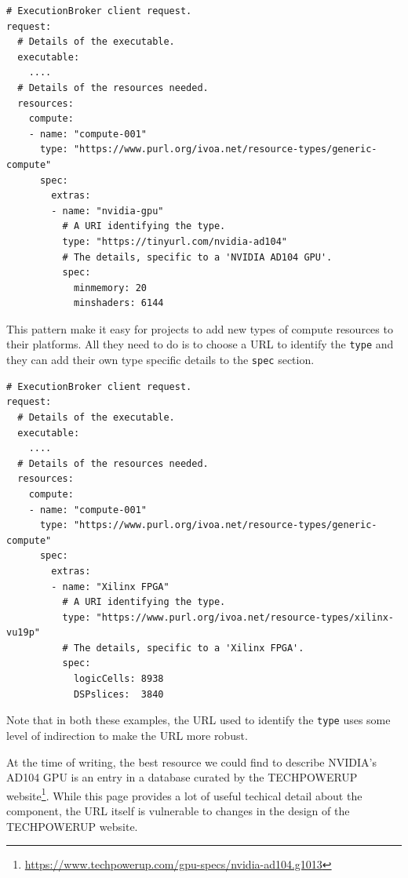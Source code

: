 \documentclass[11pt,a4paper]{ivoa}
\newcommand{\codeword}[1] {\texttt{#1}}
\newcommand{\footurl}[1] {\footnote{\url{#1}}}
\begin{document}
\begin{lstlisting}[]
# ExecutionBroker client request.
request:
  # Details of the executable.
  executable:
    ....
  # Details of the resources needed.
  resources:
    compute:
    - name: "compute-001"
      type: "https://www.purl.org/ivoa.net/resource-types/generic-compute"
      spec:
        extras:
        - name: "nvidia-gpu"
          # A URI identifying the type.
          type: "https://tinyurl.com/nvidia-ad104"
          # The details, specific to a 'NVIDIA AD104 GPU'.
          spec:
            minmemory: 20
            minshaders: 6144
\end{lstlisting}

This pattern make it easy for projects to add new types of compute resources to their
platforms. All they need to do is to choose a URL to identify the \codeword{type}
and they can add their own type specific details to the \codeword{spec} section.

\begin{lstlisting}[]
# ExecutionBroker client request.
request:
  # Details of the executable.
  executable:
    ....
  # Details of the resources needed.
  resources:
    compute:
    - name: "compute-001"
      type: "https://www.purl.org/ivoa.net/resource-types/generic-compute"
      spec:
        extras:
        - name: "Xilinx FPGA"
          # A URI identifying the type.
          type: "https://www.purl.org/ivoa.net/resource-types/xilinx-vu19p"
          # The details, specific to a 'Xilinx FPGA'.
          spec:
            logicCells: 8938
            DSPslices:  3840
\end{lstlisting}

Note that in both these examples, the URL used to identify the \codeword{type}
uses some level of indirection to make the URL more robust.

At the time of writing, the best resource we could find to describe NVIDIA's AD104 GPU
is an entry in a database curated by the TECHPOWERUP
website\footurl{https://www.techpowerup.com/gpu-specs/nvidia-ad104.g1013}.
While this page provides a lot of useful techical detail about the component,
the URL itself is vulnerable to changes in the design of the TECHPOWERUP website.
\end{document}

